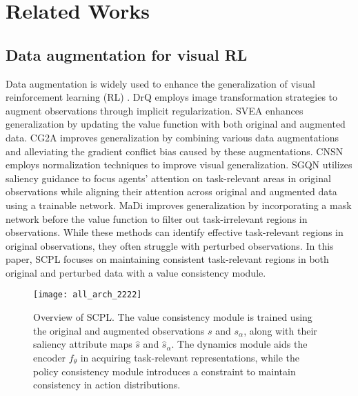 \section{Related Works}
\label{sec2}
\subsection{Data augmentation for visual RL} 
Data augmentation is widely used to enhance the generalization of visual reinforcement learning (RL) \cite{augmentation1,drg,rad}. 
DrQ \cite{drq} employs image transformation strategies to augment observations through implicit regularization. 
SVEA \cite{svea} enhances generalization by updating the value function with both original and augmented data. 
CG2A \cite{cg2a} improves generalization by combining various data augmentations and alleviating the gradient conflict bias caused by these augmentations. 
CNSN \cite{cnsn} employs normalization techniques to improve visual generalization. 
SGQN \cite{sgqn} utilizes saliency guidance to focus agents' attention on task-relevant areas in original observations while aligning their attention across original and augmented data using a trainable network.
MaDi \cite{madi} improves generalization by incorporating a mask network before the value function to filter out task-irrelevant regions in observations.
While these methods can identify effective task-relevant regions in original observations, they often struggle with perturbed observations. In this paper, SCPL focuses on maintaining consistent task-relevant regions in both original and perturbed data with a value consistency module.

\begin{figure*}
  \centering
\texttt{[image: all\_arch\_2222]}
  \caption{Overview of SCPL. 
  The value consistency module is trained using the original and augmented observations \(s\) and \(s_{\alpha}\), along with their saliency attribute maps \(\hat{s}\) and \(\hat{s}_{\alpha}\). 
  The dynamics module aids the encoder \(f_{\theta}\) in acquiring task-relevant representations, while the policy consistency module introduces a constraint to maintain consistency in action distributions.} 
  \label{fig_all_arch}
  \vspace{-.2cm}
\end{figure*}

\vspace{-.2cm}
